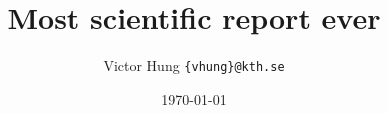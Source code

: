 \documentclass[11pt,a4paper]{article}
\title{Most scientific report ever}
\author{Victor Hung
\texttt{\{vhung\}@kth.se}}
\date{\today}
\begin{document}
\maketitle


\pagebreak
\tableofcontents
\pagebreak











\end{document}
